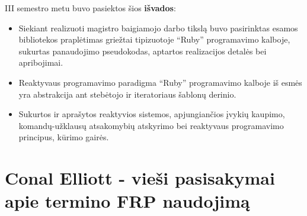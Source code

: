 \documentclass{VUMIFPSmagistrinis}
\begin{document}
III semestro metu buvo pasiektos šios \textbf{išvados}:

\begin{itemize}
  \item Siekiant realizuoti magistro baigiamojo darbo tikslą buvo pasirinktas esamos bibliotekos praplėtimas griežtai tipizuotoje ``Ruby'' programavimo kalboje, sukurtas panaudojimo pseudokodas, aptartos realizacijos detalės bei apribojimai.
  \item Reaktyvaus programavimo paradigma ``Ruby'' programavimo kalboje iš esmės yra abstrakcija ant stebėtojo ir iteratoriaus šablonų derinio.
  \item Sukurtos ir aprašytos reaktyvios sistemos, apjungiančios įvykių kaupimo, komandų-užklausų atsakomybių atskyrimo bei reaktyvaus programavimo principus, kūrimo gairės.

\end{itemize}

\printbibliography[heading=bibintoc]  %





\appendix  %

\section{Conal Elliott - vieši pasisakymai apie termino FRP naudojimą}
\end{document}
